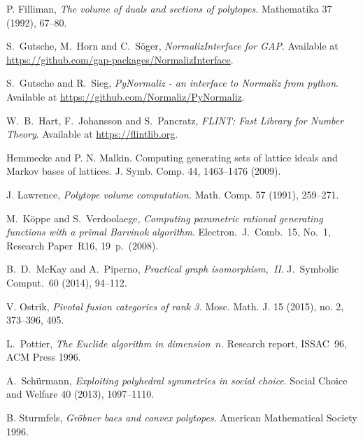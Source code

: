 \documentclass[12pt,a4paper]{scrartcl}
\theoremstyle{definition}
\begin{document}
\begin{thebibliography}{15.}
P. Filliman, \emph{The volume of duals and sections of polytopes. } Mathematika 37 (1992), 67--80.

S.~Gutsche, M.~Horn and C.~S\"oger,
\emph{NormalizInterface for GAP}.
Available at \url{https://github.com/gap-packages/NormalizInterface}.

S.~Gutsche and R.~Sieg,
\emph{PyNormaliz - an interface to Normaliz from python}.
Available at \url{https://github.com/Normaliz/PyNormaliz}.

W.~B.~Hart, F.~Johansson and S.~Pancratz,
\emph{FLINT: Fast Library for Number Theory}.
Available at \url{https://flintlib.org}.

Hemmecke and P. N. Malkin. Computing generating sets of lattice ideals and Markov bases of
lattices. J. Symb. Comp. 44, 1463--1476 (2009).

 J. Lawrence, \emph{Polytope volume computation.} Math. Comp. 57 (1991), 259--271.

M.~K\"oppe and S.~Verdoolaege,
\emph{Computing parametric rational generating functions with a primal Barvinok algorithm}.
Electron.\ J.\ Comb.\ 15, No.\ 1, Research Paper~R16, 19~p.\ (2008).

B.~D.~McKay and A.~Piperno,
\emph{Practical graph isomorphism,~II}.
J.\ Symbolic Comput.\ 60 (2014), 94--112.

V. Ostrik, \emph{Pivotal fusion categories of rank 3.} Mosc. Math. J. 15 (2015), no. 2, 373--396, 405.

L.~Pottier,
\emph{The Euclide algorithm in dimension~$n$}.
Research report, ISSAC~96, ACM Press 1996.

A.~Sch\"urmann,
\emph{Exploiting polyhedral symmetries in social choice}.
Social Choice and Welfare 40 (2013), 1097--1110.

B. Sturmfels,
\emph{Gröbner baes and convex polytopes}.
American Mathematical Society 1996.
\end{thebibliography}
\newpage

\printindex
\end{document}
